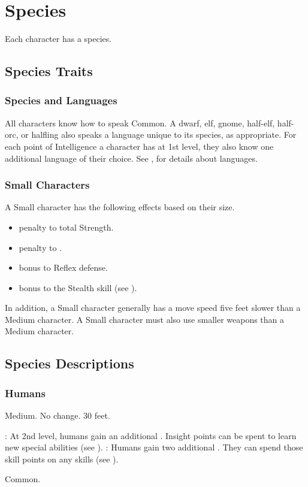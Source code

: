\chapter{Species}\label{Species}

Each character has a species.

\section{Species Traits}

\subsection{Species and Languages}
All characters know how to speak Common. A dwarf, elf, gnome, half-elf, half-orc, or halfling also speaks a language unique to its species, as appropriate. For each point of Intelligence a character has at 1st level, they also know one additional language of their choice. See , for details about languages.

\subsection{Small Characters}\label{Small Characters}
A Small character has the following effects based on their size.
\begin{itemize}
    \item {} penalty to total Strength.
    \item {} penalty to .
    \item {} bonus to Reflex defense.
    \item {} bonus to the Stealth skill (see ).
\end{itemize}

In addition, a Small character generally has a move speed five feet slower than a Medium character. A Small character must also use smaller weapons than a Medium character.

\section{Species Descriptions}

\subsection{Humans}
 Medium.
 No change.
 30 feet.
\begin{itemize}
    : At 2nd level, humans gain an additional .
        Insight points can be spent to learn new special abilities (see ).
    : Humans gain two additional . They can spend those skill points on any skills (see ).
\end{itemize}
 Common.

